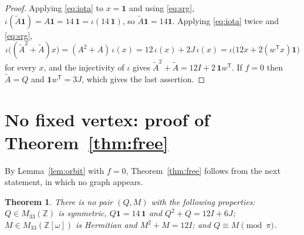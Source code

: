 \documentclass[11pt,a4paper]{article}
\newtheorem{theorem}{Theorem}[section]
\theoremstyle{remark}
\newcommand{\ZZ}{\mathbb{Z}}
\newcommand{\one}{\mathbf{1}}
\newcommand{\tp}{\mathsf{T}}
\newcommand{\tA}{\widetilde{A}}
\begin{document}
\begin{proof}
Applying \eqref{eq:iota} to $x=\one$ and using \eqref{eq:srg}, $\iota(\tA\one)=A\one=14\,\one=\iota(14\,\one)$, so
$\tA\one=14\one$. Applying \eqref{eq:iota} twice and \eqref{eq:srg},
\[
\iota\bigl((\tA^2+\tA)x\bigr)=(A^2+A)\,\iota(x)=12\,\iota(x)+2J\,\iota(x)=\iota\bigl(12x+2(w^{\tp}x)\one\bigr)
\]
for every $x$, and the injectivity of $\iota$ gives $\tA^2+\tA=12I+2\,\one w^{\tp}$. If $f=0$ then $\tA=Q$ and
$\one w^{\tp}=3J$, which gives the last assertion.
\end{proof}

\section{No fixed vertex: proof of Theorem~\ref{thm:free}}\label{sec:free}

By Lemma~\ref{lem:orbit} with $f=0$, Theorem~\ref{thm:free} follows from the next statement, in which no graph
appears.

\begin{theorem}\label{thm:freemat}
There is no pair $(Q,M)$ with the following properties:
$Q\in M_{33}(\ZZ)$ is symmetric, $Q\one=14\,\one$ and $Q^2+Q=12I+6J$;
$M\in M_{33}(\ZZ[\omega])$ is Hermitian and $M^2+M=12I$;
and $Q\equiv M\pmod\pi$.
\end{theorem}
\end{document}

